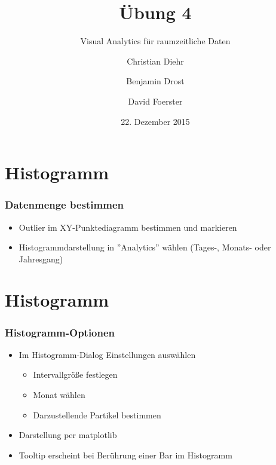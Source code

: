 \documentclass{beamer}
\title{Übung 4}
\subtitle{Visual Analytics für raumzeitliche Daten}
\author{Christian Diehr \and Benjamin Drost \and David Foerster}
\institute{Institut für Informatik\\Humboldt-Universität zu Berlin}
\date{22. Dezember 2015}
\begin{document}
    \begin{frame}
        \titlepage
    \end{frame}
    \logo %
        
    \section{Histogramm}
    \begin{frame}
			\frametitle{Datenmenge bestimmen}
			\begin{itemize}
				\setlength\itemsep{1em}
				\item Outlier im XY-Punktediagramm bestimmen und markieren				
				\item Histogrammdarstellung in ''Analytics''  wählen (Tages-, Monats- oder Jahresgang)
			\end{itemize}
    \end{frame}
    
    \section{Histogramm}
    \begin{frame}
			\frametitle{Histogramm-Optionen}
			\begin{itemize}
				\setlength\itemsep{1em}
				\item Im Histogramm-Dialog Einstellungen auswählen
				\begin{itemize}
					\setlength\itemsep{1em}
					\item Intervallgröße festlegen 
					\item Monat wählen
					\item Darzustellende Partikel bestimmen				
				\end{itemize}
				\item Darstellung per matplotlib
				\item Tooltip erscheint bei Berührung einer Bar im Histogramm				
			\end{itemize}
    \end{frame}
\end{document}
